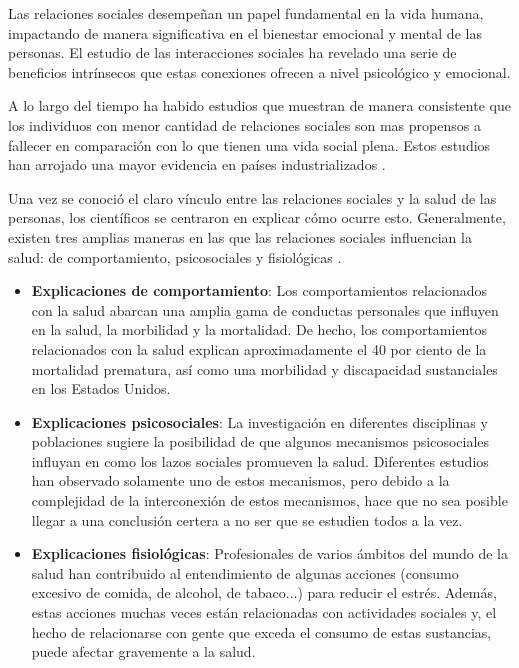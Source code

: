 Las relaciones sociales desempeñan un papel fundamental en la vida humana, impactando de manera significativa en el bienestar emocional y mental de las personas. El estudio de las interacciones sociales ha revelado una serie de beneficios intrínsecos que estas conexiones ofrecen a nivel psicológico y emocional.

A lo largo del tiempo ha habido estudios que muestran de manera consistente que los individuos con menor cantidad de relaciones sociales son mas propensos a fallecer en comparación con lo que tienen una vida social plena. Estos estudios han arrojado una mayor evidencia en países industrializados \citep{House1988}.

Una vez se conoció el claro vínculo entre las relaciones sociales y la salud de las personas, los científicos se centraron en explicar cómo ocurre esto. Generalmente, existen tres amplias maneras en las que las relaciones sociales influencian la salud: de comportamiento, psicosociales y fisiológicas \citep{doi:10.1177/0022146510383501}.

\begin{itemize}
	\item \textbf{Explicaciones de comportamiento}: 
	Los comportamientos relacionados con la salud abarcan una amplia gama de conductas personales que influyen en la salud, la morbilidad y la mortalidad. De hecho, los comportamientos relacionados con la salud explican aproximadamente el 40 por ciento de la mortalidad prematura, así como una morbilidad y discapacidad sustanciales en los Estados Unidos. \citep{activePolicyAttention}
	
	\item \textbf{Explicaciones psicosociales}: La investigación en diferentes disciplinas y poblaciones sugiere la posibilidad de que algunos mecanismos psicosociales influyan en como los lazos sociales promueven la salud. Diferentes estudios han observado solamente uno de estos mecanismos, pero debido a la complejidad de la interconexión de estos mecanismos, hace que no sea posible llegar a una conclusión certera a no ser que se estudien todos a la vez.
	
	\item \textbf{Explicaciones fisiológicas}: Profesionales de varios ámbitos del mundo de la salud han  contribuido al entendimiento de algunas acciones (consumo excesivo de comida, de alcohol, de tabaco...) para reducir el estrés. Además, estas acciones muchas veces están relacionadas con actividades sociales y, el hecho de relacionarse con gente que exceda el consumo de estas sustancias, puede afectar gravemente a la salud.
	
	
\end{itemize}

